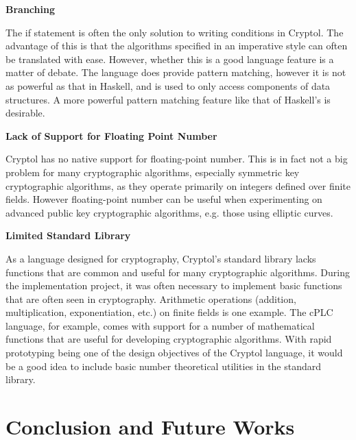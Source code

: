 \documentclass[a4paper, notitlepage]{report}
\renewcommand{\paragraph}[1]{\vspace*{1em}\noindent\textbf{#1}\hspace*{1em}}
\begin{document}
\paragraph{Branching}

The if statement is often the only solution to writing conditions in Cryptol. 
The advantage of this is that the
algorithms specified in an imperative style can often be translated with ease. However,
whether this is a good language feature is a matter of debate. The language does
provide pattern matching, however it is not as powerful as that in Haskell, and is
used to only access components of data structures.
A more powerful pattern matching feature like that of Haskell's is desirable.

\paragraph{Lack of Support for Floating Point Number}

Cryptol has no native support for floating-point number. This is in fact not a big 
problem for many cryptographic algorithms, especially symmetric key cryptographic
algorithms, as they operate primarily on integers defined over finite fields. 
However floating-point number can be useful when experimenting on advanced
public key cryptographic algorithms, e.g. those using elliptic curves.

\paragraph{Limited Standard Library}

As a language designed for cryptography, Cryptol's standard library lacks functions 
that are common and useful for many cryptographic algorithms. 
During the implementation project, it was often necessary to implement basic functions
that are often seen in cryptography.
Arithmetic operations 
(addition, multiplication, exponentiation, etc.) on finite fields is one example. 
The cPLC~\cite{bangerter2011cplc} language, for example, comes with support for a number
 of mathematical functions that are useful for developing cryptographic algorithms.
With rapid prototyping being one of the design objectives of the Cryptol language, 
it would be a good idea to include basic number theoretical utilities in the 
standard library.

\newpage
\chapter{Conclusion and Future Works}
\label{chap:conclusion}
\end{document}
